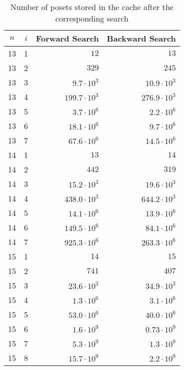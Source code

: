 \documentclass[twoside,leqno,twocolumn]{article}
\begin{document}
\begin{table}[!t]
  \renewcommand{\arraystretch}{1.2}
  \caption{Number of posets stored in the cache after the corresponding search}
  \label{table:cache_entries}
  \centering
  \begin{tabular}{c|c|r|r}
    $n$ & $i$ & \textbf{Forward Search} & \textbf{Backward Search} \\
    \hline
    13  & 1   & $12$                    & $13$                     \\
    13  & 2   & $329$                   & $245$                    \\
    13  & 3   & $9.7 \cdot 10^3$        & $10.9 \cdot 10^3$        \\
    13  & 4   & $199.7 \cdot 10^3$      & $276.9 \cdot 10^3$       \\
    13  & 5   & $3.7 \cdot 10^6$        & $2.2 \cdot 10^6$         \\
    13  & 6   & $18.1 \cdot 10^6$       & $9.7 \cdot 10^6$         \\
    13  & 7   & $67.6 \cdot 10^6$       & $14.5 \cdot 10^6$        \\
    \hline
    14  & 1   & $13$                    & $14$                     \\
    14  & 2   & $442$                   & $319$                    \\
    14  & 3   & $15.2 \cdot 10^3$       & $19.6 \cdot 10^3$        \\
    14  & 4   & $438.0 \cdot 10^3$      & $644.2 \cdot 10^3$       \\
    14  & 5   & $14.1 \cdot 10^6$       & $13.9 \cdot 10^6$        \\
    14  & 6   & $149.5 \cdot 10^6$      & $84.1 \cdot 10^6$        \\
    14  & 7   & $925.3 \cdot 10^6$      & $263.3 \cdot 10^6$       \\
    \hline
    15  & 1   & $14$                    & $15$                     \\
    15  & 2   & $741$                   & $407$                    \\
    15  & 3   & $23.6 \cdot 10^3$       & $34.9 \cdot 10^3$        \\
    15  & 4   & $1.3 \cdot 10^6$        & $3.1 \cdot 10^6$         \\
    15  & 5   & $53.0 \cdot 10^6$       & $40.0 \cdot 10^6$        \\
    15  & 6   & $1.6 \cdot 10^9$        & $0.73 \cdot 10^9$        \\
    15  & 7   & $5.3 \cdot 10^9$        & $1.3 \cdot 10^9$         \\
    15  & 8   & $15.7 \cdot 10^9$       & $2.2 \cdot 10^9$         \\
  \end{tabular}
\end{table}
\end{document}
